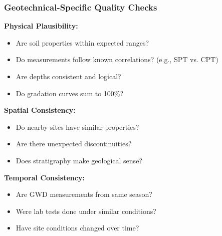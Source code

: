 \documentclass[aspectratio=169]{beamer}
\begin{document}
\begin{frame}
\frametitle{Geotechnical-Specific Quality Checks}

\textbf{Physical Plausibility:}
\begin{itemize}
    \item Are soil properties within expected ranges?
    \item Do measurements follow known correlations? (e.g., SPT vs. CPT)
    \item Are depths consistent and logical?
    \item Do gradation curves sum to 100\%?
\end{itemize}

\vspace{0.3cm}

\textbf{Spatial Consistency:}
\begin{itemize}
    \item Do nearby sites have similar properties?
    \item Are there unexpected discontinuities?
    \item Does stratigraphy make geological sense?
\end{itemize}

\vspace{0.3cm}

\textbf{Temporal Consistency:}
\begin{itemize}
    \item Are GWD measurements from same season?
    \item Were lab tests done under similar conditions?
    \item Have site conditions changed over time?
\end{itemize}

\end{frame}
\end{document}
